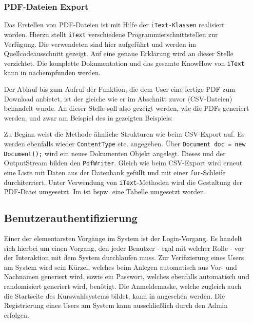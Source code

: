 \subsubsection{PDF-Dateien Export}

Das Erstellen von PDF-Dateien ist mit Hilfe der \texttt{iText-Klassen} realisiert worden.
Hierzu stellt \texttt{iText} verschiedene Programmierschnittstellen zur Verfügung. Die verwendeten sind hier aufgeführt und werden im Quellcodeausschnitt gezeigt. Auf eine genaue Erklärung wird an dieser Stelle verzichtet. Die komplette Dokumentation und das gesamte KnowHow von \texttt{iText} kann in \cite{LowagieB-iText} nachempfunden werden.  

Der Ablauf bis zum Aufruf der Funktion, die dem User eine fertige PDF zum Download anbietet, ist der gleiche wie er im Abschnitt zuvor (CSV-Dateien) behandelt wurde.
An dieser Stelle soll also gezeigt werden, wie die PDFs generiert werden, und zwar am Beispiel des in  gezeigten Beispiels:

		
	
Zu Beginn weist die Methode ähnliche Strukturen wie beim CSV-Export auf.
Es werden ebenfalls wieder \texttt{ContentType} etc. angegeben. Über \texttt{Document doc = new Document();} wird ein neues Dokumenten Objekt angelegt. Dieses und der OutputStream bilden den \texttt{PdfWriter}.
Gleich wie beim CSV-Export wird erneut eine Liste mit Daten aus der Datenbank gefüllt und mit einer \texttt{for}-Schleife durchiterriert.
Unter Verwendung von \texttt{iText}-Methoden wird die Gestaltung der PDF-Datei umgesetzt. Im  ist bspw. eine Tabelle umgesetzt worden.

\subsection{Benutzerauthentifizierung}

Einer der elementarsten Vorgänge im System ist der Login-Vorgang. Es handelt sich hierbei um einen Vorgang, den jeder Benutzer - egal mit welcher Rolle - vor der Interaktion mit dem System durchlaufen muss. Zur Verifizierung eines Users am System wird sein Kürzel, welches beim Anlegen automatisch aus Vor- und Nachnamen generiert wird, sowie ein Passwort, welches ebenfalls automatisch und randomisiert generiert wird, benötigt. Die Anmeldemaske, welche zugleich auch die Startseite des Kurswahlsystems bildet, kann in  angesehen werden. Die Registrierung eines Users am System kann ausschließlich durch den Admin erfolgen.

